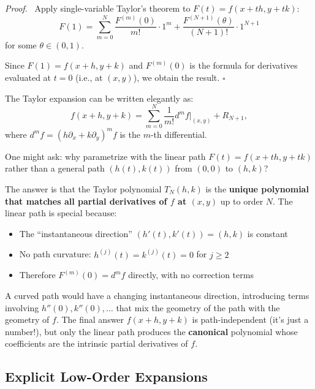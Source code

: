 \documentclass[11pt]{report}
\renewenvironment{proof}[1][Proof]{\par\noindent\textit{#1.}\ }{\hfill$\square$\par\medskip}
\begin{document}
\begin{proof}
Apply single-variable Taylor's theorem to $F(t) = f(x + th, y + tk)$:
\[
F(1) = \sum_{m=0}^{N} \frac{F^{(m)}(0)}{m!} \cdot 1^m + \frac{F^{(N+1)}(\theta)}{(N+1)!} \cdot 1^{N+1}
\]
for some $\theta \in (0, 1)$.

Since $F(1) = f(x + h, y + k)$ and $F^{(m)}(0)$ is the formula for derivatives evaluated at $t = 0$ (i.e., at $(x, y)$), we obtain the result.
\end{proof}

\begin{remark}
The Taylor expansion can be written elegantly as:
\[
f(x + h, y + k) = \sum_{m=0}^{N} \frac{1}{m!} d^m f \big|_{(x,y)} + R_{N+1},
\]
where $d^m f = \left( h \partial_x + k \partial_y \right)^m f$ is the $m$-th differential.
\end{remark}

\begin{remark}
One might ask: why parametrize with the linear path $F(t) = f(x + th, y + tk)$ rather than a general path $(h(t), k(t))$ from $(0,0)$ to $(h,k)$?

The answer is that the Taylor polynomial $T_N(h,k)$ is the \textbf{unique polynomial that matches all partial derivatives of $f$ at $(x,y)$} up to order $N$. The linear path is special because:
\begin{itemize}[itemsep=2pt]
    \item The ``instantaneous direction'' $(h'(t), k'(t)) = (h, k)$ is constant
    \item No path curvature: $h^{(j)}(t) = k^{(j)}(t) = 0$ for $j \geq 2$
    \item Therefore $F^{(m)}(0) = d^m f$ directly, with no correction terms
\end{itemize}

A curved path would have a changing instantaneous direction, introducing terms involving $h''(0), k''(0), \ldots$ that mix the geometry of the path with the geometry of $f$. The final answer $f(x+h,y+k)$ is path-independent (it's just a number!), but only the linear path produces the \textbf{canonical} polynomial whose coefficients are the intrinsic partial derivatives of $f$.
\end{remark}

\subsection{Explicit Low-Order Expansions}
\end{document}
